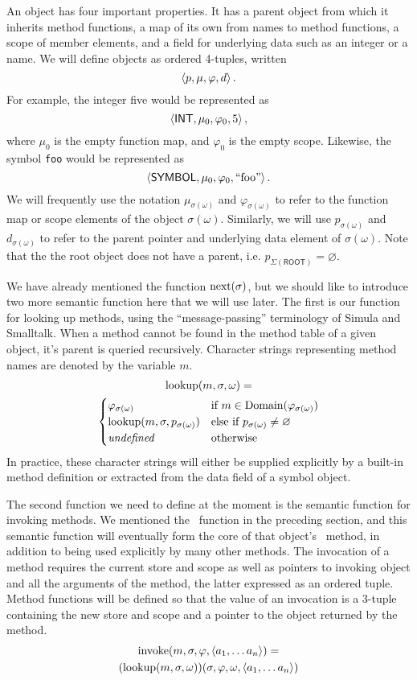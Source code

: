 \documentclass[twocolumn]{article}
\begin{document}
An object has four important properties. It has a parent object from
which it inherits method functions, a map of its own from names to
method functions, a scope of member elements, and a field for
underlying data such as an integer or a name. We will define objects
as ordered 4-tuples, written
\[ \left< p, \mu, \varphi, d \right> .\]
For example, the integer five would be represented as
\[ \left< \mathsf{INT}, \mu_0, \varphi_0, 5 \right>, \]
where $\mu_0$ is the empty function map, and $\varphi_0$ is the empty
scope. Likewise, the symbol \texttt{foo} would be represented as
\[ \left< \mathsf{SYMBOL}, \mu_0, \varphi_0, \text{``foo''} \right>. \] We
will frequently use the notation $\mu_{\sigma(\omega)}$ and
$\varphi_{\sigma(\omega)}$ to refer to the function map or scope
elements of the object $\sigma(\omega)$. Similarly, we will use
$p_{\sigma(\omega)}$ and $d_{\sigma(\omega)}$ to refer to the parent
pointer and underlying data element of $\sigma(\omega)$. Note that the
the root object does not have a parent, i.e.
$p_{\Sigma(\mathsf{ROOT})} = \varnothing$.

We have already mentioned the function $\operatorname{next}(\sigma)$, but we should
like to introduce two more semantic function here that we will use
later. The first is our function for looking up methods, using the
``message-passing'' terminology of Simula and Smalltalk. When a method
cannot be found in the method table of a given object, it's parent is
queried recursively. Character strings representing method names are
denoted by the variable $m$.
\begin{multline*} \operatorname{lookup}(m, \sigma, \omega) = \\
\begin{cases}
  \varphi_{\sigma(\omega)} &\text{if } m \in
  \operatorname{Domain}(\varphi_{\sigma(\omega)}) \\
  \operatorname{lookup}(m,\sigma,p_{\sigma(\omega)})
  &\text{else if }p_{\sigma(\omega)}\neq \varnothing\\
  \mathit{undefined} & \text {otherwise}
  \end{cases}
\end{multline*}
In practice, these character strings will either be supplied
explicitly by a built-in method definition or extracted from the data
field of a symbol object.

The second function we need to define at the moment is the semantic
function for invoking methods. We mentioned the \msg\ function in
the preceding section, and this semantic function will eventually form
the core of that object's \call\ method, in addition to being used
explicitly by many other methods. The invocation of a method requires
the current store and scope as well as pointers to invoking object and
all the arguments of the method, the latter expressed as an ordered
tuple. Method functions will be defined so that the value of an
invocation is a 3-tuple containing the new store and scope and a
pointer to the object returned by the method.
\begin{multline*}
  \operatorname{invoke}( m, \sigma, \varphi, \left< a_1,\ldots a_n\right>) = \\
  (\operatorname{lookup}(m, \sigma, \omega))(\sigma,\varphi,\omega,
  \left< a_1,\ldots a_n \right> )
\end{multline*}
  
\end{document}
